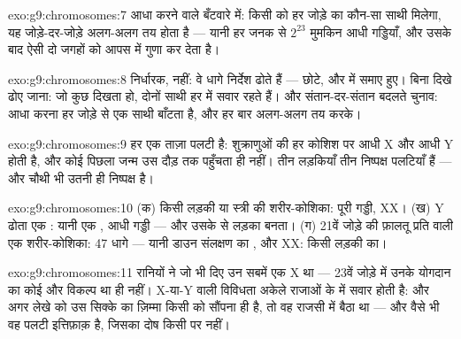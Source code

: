 \begin{solution}{exo:g9:chromosomes:7}
आधा करने वाले बँटवारे में: किसी  को हर जोड़े का कौन-सा साथी मिलेगा,
यह जोड़े-दर-जोड़े अलग-अलग तय होता है --- यानी हर जनक से $2^{23}$ मुमकिन
आधी गड्डियाँ, और उसके बाद  ऐसी दो जगहों को आपस में गुणा कर देता
है।
\end{solution}

\begin{solution}{exo:g9:chromosomes:8}
निर्धारक,  नहीं: वे धागे निर्देश ढोते हैं --- छोटे, और  में
समाए हुए। बिना दिखे ढोए जाना: जो कुछ दिखता हो, दोनों साथी हर  में
सवार रहते हैं। और संतान-दर-संतान बदलते चुनाव: आधा करना हर जोड़े से एक
साथी बाँटता है, और हर बार अलग-अलग तय करके।
\end{solution}

\begin{solution}{exo:g9:chromosomes:9}
हर  एक ताज़ा पलटी है: शुक्राणुओं की  हर कोशिश पर आधी X और आधी
Y होती है, और कोई पिछला जन्म उस दौड़ तक पहुँचता ही नहीं। तीन लड़कियाँ
तीन निष्पक्ष पलटियाँ हैं --- और चौथी भी उतनी ही निष्पक्ष है।
\end{solution}

\begin{solution}{exo:g9:chromosomes:10}
(क) किसी लड़की या स्त्री की शरीर-कोशिका: पूरी गड्डी, XX। (ख) Y ढोता एक
: यानी एक , आधी गड्डी --- और उसके  से लड़का बनता।
(ग) 21वें जोड़े की फ़ालतू प्रति वाली एक शरीर-कोशिका: 47 धागे --- यानी
डाउन संलक्षण का , और XX: किसी लड़की का।
\end{solution}

\begin{solution}{exo:g9:chromosomes:11}
रानियों ने जो भी  दिए उन सबमें एक X था --- 23वें जोड़े में उनके
योगदान का कोई और विकल्प था ही नहीं। X-या-Y वाली विविधता अकेले राजाओं के
 में सवार होती है: और अगर लेखे को उस सिक्के का ज़िम्मा किसी को
सौंपना ही है, तो वह राजसी  में बैठा था --- और वैसे भी वह पलटी
इत्तिफ़ाक़ है, जिसका दोष किसी पर नहीं।
\end{solution}

